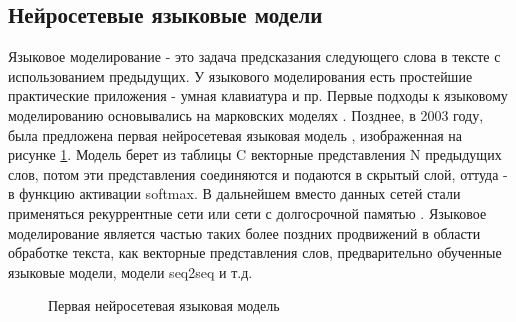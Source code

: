 \subsection{Нейросетевые языковые модели}

Языковое моделирование - это задача предсказания следующего слова в тексте с использованием предыдущих. У языкового моделирования есть простейшие практические приложения - умная клавиатура и пр. Первые подходы к языковому моделированию основывались на марковских моделях\cite{kneser_1995} . Позднее, в 2003 году, была предложена первая нейросетевая языковая модель \cite{bengio_2003}, изображенная на рисунке \ref{fig:Neuro1-Feedforward}. 
Модель берет из таблицы C векторные представления N предыдущих слов, потом эти представления соединяются и подаются в скрытый слой, оттуда - в функцию активации softmax. В дальнейшем вместо данных сетей стали применяться рекуррентные сети \cite{mikolov_2010} или сети с долгосрочной памятью \cite{hochreiter_1997}.%
Языковое моделирование является частью таких более поздних продвижений в области обработке текста, как векторные представления слов, предварительно обученные языковые модели, модели seq2seq и т.д.

\begin{figure}[ht]
  \caption{Первая нейросетевая языковая модель}\label{fig:Neuro1-Feedforward}
\end{figure}


